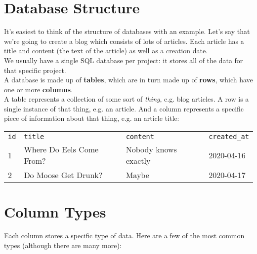 \section{Database Structure}

It's easiest to think of the structure of databases with an example. Let's say that we're going to create a blog which consists of lots of articles. Each article has a title and content (the text of the article) as well as a creation date.
\\

We usually have a single SQL database per project: it stores all of the data for that specific project.
\\

A database is made up of \textbf{tables}, which are in turn made up of \textbf{rows}, which have one or more \textbf{columns}.
\\

A table represents a collection of some sort of \textit{thing}, e.g. blog articles. A row is a single instance of that thing, e.g. an article. And a column represents a specific piece of information about that thing, e.g. an article title:
\\

\begin{tabu}{l l l X}
    \texttt{id} & \texttt{title}            & \texttt{content}     & \texttt{created\_at} \\
    1           & Where Do Eels Come From?  & Nobody knows exactly & 2020-04-16 \\
    2           & Do Moose Get Drunk?       & Maybe                & 2020-04-17 \\
\end{tabu}

\par\bigskip


\section{Column Types}

Each column stores a specific type of data. Here are a few of the most common types (although there are many more):
\\

